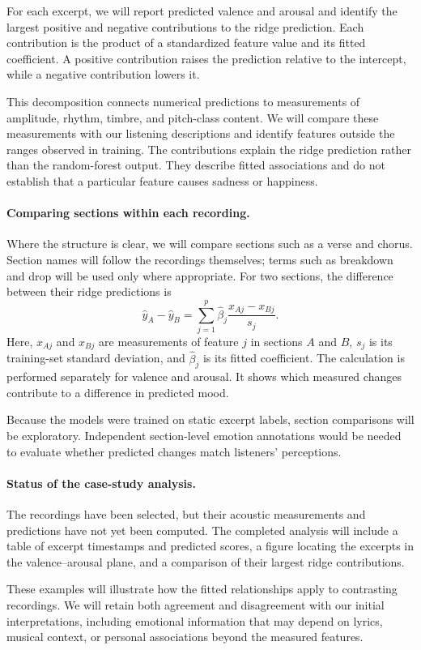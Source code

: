 For each excerpt, we will report predicted valence and arousal and identify the largest positive and negative contributions to the ridge prediction. Each contribution is the product of a standardized feature value and its fitted coefficient. A positive contribution raises the prediction relative to the intercept, while a negative contribution lowers it.

This decomposition connects numerical predictions to measurements of amplitude, rhythm, timbre, and pitch-class content. We will compare these measurements with our listening descriptions and identify features outside the ranges observed in training. The contributions explain the ridge prediction rather than the random-forest output. They describe fitted associations and do not establish that a particular feature causes sadness or happiness.

\paragraph{Comparing sections within each recording.}

Where the structure is clear, we will compare sections such as a verse and chorus. Section names will follow the recordings themselves; terms such as breakdown and drop will be used only where appropriate. For two sections, the difference between their ridge predictions is
\begin{equation}
\widehat{y}_A-\widehat{y}_B
=\sum_{j=1}^{p}\widehat{\beta}_j
\frac{x_{Aj}-x_{Bj}}{s_j}.
\label{eq:case_section_difference}
\end{equation}
Here, $x_{Aj}$ and $x_{Bj}$ are measurements of feature $j$ in sections $A$ and $B$, $s_j$ is its training-set standard deviation, and $\widehat{\beta}_j$ is its fitted coefficient. The calculation is performed separately for valence and arousal. It shows which measured changes contribute to a difference in predicted mood.

Because the models were trained on static excerpt labels, section comparisons will be exploratory. Independent section-level emotion annotations would be needed to evaluate whether predicted changes match listeners' perceptions.

\paragraph{Status of the case-study analysis.}

The recordings have been selected, but their acoustic measurements and predictions have not yet been computed. The completed analysis will include a table of excerpt timestamps and predicted scores, a figure locating the excerpts in the valence--arousal plane, and a comparison of their largest ridge contributions.

These examples will illustrate how the fitted relationships apply to contrasting recordings. We will retain both agreement and disagreement with our initial interpretations, including emotional information that may depend on lyrics, musical context, or personal associations beyond the measured features.
